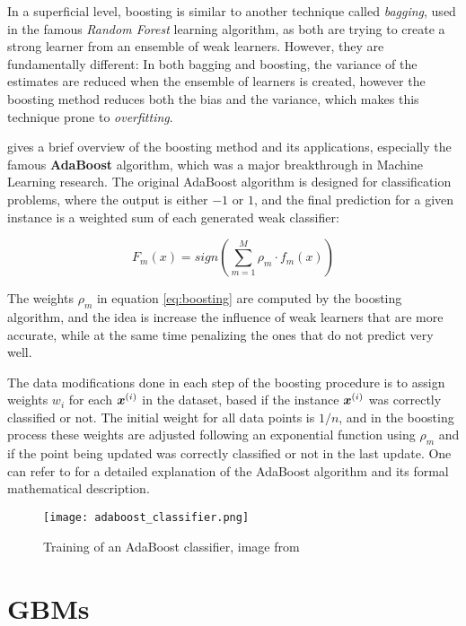 In a superficial level, boosting is similar to another technique called \textit{bagging}, used in the famous \textit{Random Forest} learning algorithm, as both are trying to create a strong learner from an ensemble of weak learners. However, they are fundamentally different: In both bagging and boosting, the variance of the estimates are reduced when the ensemble of learners is created, however the boosting method reduces both the bias and the variance, which makes this technique prone to \textit{overfitting}.

\cite{Schapire:1999:BIB:1624312.1624417} gives a brief overview of the boosting method and its applications, especially the famous \textbf{AdaBoost} algorithm, which was a major breakthrough in Machine Learning research. The original AdaBoost algorithm is designed for classification problems, where the output is either $-1$ or $1$, and the final prediction for a given instance is a weighted sum of each generated weak classifier:

\begin{equation}\label{eq:boosting}
    F_m(x) = sign(\sum_{m=1}^{M}\rho_m\cdot f_m(x))
\end{equation}

The weights $\rho_m$ in equation \ref{eq:boosting} are computed by the boosting algorithm, and the idea is increase the influence of weak learners that are more accurate, while at the same time penalizing the ones that do not predict very well. 

The data modifications done in each step of the boosting procedure is to assign weights $w_i$ for each $\bm{x}^{(i)}$ in the dataset, based if the instance $\bm{x}^{(i)}$ was correctly classified or not. The initial weight for all data points is $1/n$, and in the boosting process these weights are adjusted following an exponential function using $\rho_m$ and if the point being updated was correctly classified or not in the last update. One can refer to \cite{hastie2009elements} for a detailed explanation of the AdaBoost algorithm and its formal mathematical description. 

\begin{figure}[!h]
  \centering
  \texttt{[image: adaboost\_classifier.png]} 
  \caption{Training of an AdaBoost classifier, image from \cite{adaboost:brendan}}
  \label{fig:humanbeta} 
\end{figure}

\section{GBMs}


